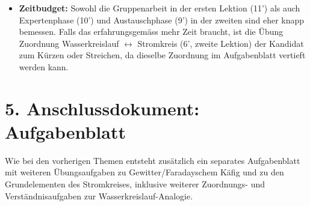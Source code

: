 \documentclass[11pt,a4paper]{article}
\begin{document}
\begin{itemize}[leftmargin=1.2cm,itemsep=0.4em]
  nicht durch drei teilbar ist, braucht es einzelne Vierergruppen (ein
  Thema doppelt) oder eine kleine Gruppe mit nur zwei Themen -- bitte
  kurz Rücksprache, wie gross die Klasse 1f aktuell ist.
  \item \textbf{Zeitbudget:} Sowohl die Gruppenarbeit in der ersten
  Lektion (11') als auch Expertenphase (10') und Austauschphase (9') in
  der zweiten sind eher knapp bemessen. Falls das erfahrungsgemäss mehr
  Zeit braucht, ist die Übung \glqq Zuordnung Wasserkreislauf
  $\leftrightarrow$ Stromkreis\grqq{} (6', zweite Lektion) der Kandidat
  zum Kürzen oder Streichen, da dieselbe Zuordnung im Aufgabenblatt
  vertieft werden kann.
\end{itemize}

\section*{5. Anschlussdokument: Aufgabenblatt}

Wie bei den vorherigen Themen entsteht zusätzlich ein separates
Aufgabenblatt mit weiteren Übungsaufgaben zu Gewitter/Faradayschem Käfig
und zu den Grundelementen des Stromkreises, inklusive weiterer
Zuordnungs- und Verständnisaufgaben zur Wasserkreislauf-Analogie.
\end{document}
